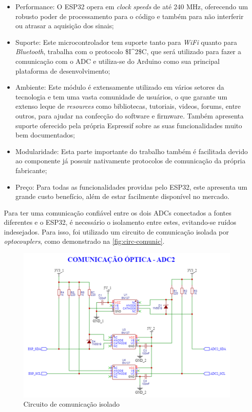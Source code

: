 \begin{itemize}
    \item Performance: O ESP32 opera em \textit{clock speeds} de até 240 MHz, oferecendo um robusto poder de processamento para o código e também para não interferir ou atrasar a aquisição dos sinais;
    \item Suporte: Este microcontrolador tem suporte tanto para \textit{WiFi} quanto para \textit{Bluetooth}, trabalha com o protocolo \gls{$I^2$C}, que será utilizado para fazer a comunicação com o \gls{ADC} e utiliza-se do Arduino como sua principal plataforma de desenvolvimento;
    \item Ambiente: Este módulo é extensamente utilizado em vários setores da tecnologia e tem uma vasta comunidade de usuários, o que garante um extenso leque de \textit{resources} como bibliotecas, tutoriais, videos, forums, entre outros, para ajudar na confecção do software e firmware. Também apresenta suporte oferecido pela própria Espressif sobre as suas funcionalidades muito bem documentados;
    \item Modularidade: Esta parte importante do trabalho também é facilitada devido ao componente já possuir nativamente protocolos de comunicação da própria fabricante;
    \item Preço: Para todas as funcionalidades providas pelo ESP32, este apresenta um grande custo benefício, além de estar facilmente disponível no mercado.
\end{itemize}

Para ter uma comunicação confiável entre os dois \gls{ADC}s conectados a fontes diferentes e o ESP32, é necessário o isolamento entre estes, evitando-se ruídos indesejados. Para isso, foi utilizado um circuito de comunicação isolada por \textit{optocouplers}, como demonstrado na \autoref{fig:circ-comunic}.

\begin{figure}[htb!]
    \caption{Circuito de comunicação isolado}
    \label{fig:circ-comunic}
    \includegraphics[width=1.0\textwidth]{figuras/circ-comunic.png}
    \fonte{}
\end{figure}


